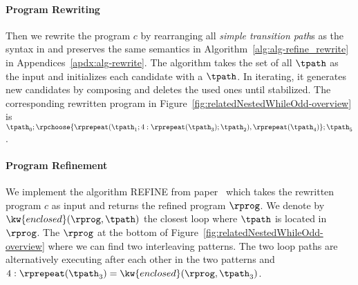 \paragraph{Program Rewriting}
Then we rewrite the program $c$ by rearranging all \emph{simple transition path}s as the syntax in \cite{GulwaniJK09} and preserves the same semantics in Algorithm~\ref{alg:alg-refine_rewrite} in Appendices~\ref{apdx:alg-rewrite}.
The algorithm takes the set of all $\tpath$ as the input and initializes each candidate with a
$\tpath$.
In iterating, it generates new candidates by composing and deletes the used ones until stabilized.
%
The corresponding rewritten program in Figure~\ref{fig:relatedNestedWhileOdd-overview} is
$ 
\tpath_0; \rpchoose{\rprepeat(\tpath_1; 4:\rprepeat(\tpath_3); \tpath_2),\rprepeat(\tpath_4) }; \tpath_5
$.

\paragraph{Program Refinement}
We implement the algorithm REFINE from paper~\cite{GulwaniJK09} which takes the rewritten program $c$ as input and returns the
refined program $\rprog$. We denote by $\kw{enclosed}(\rprog, \tpath)$ the closest loop where $\tpath$ is located in $\rprog$.
The $\rprog$ at the bottom of Figure~\ref{fig:relatedNestedWhileOdd-overview} where we can find two interleaving patterns.
The two loop paths are alternatively executing after each other in the two patterns and
 $4:\rprepeat(\tpath_3) = \kw{enclosed}(\rprog, \tpath_3)$.

